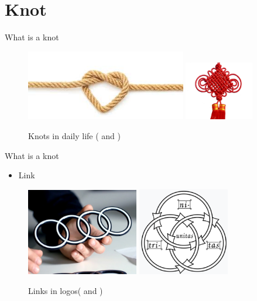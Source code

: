 \section{Knot}
\begin{frame}{What is a knot}
	\begin{figure}
		\centering
		\includegraphics[width=7cm]{Pictures/images.jpg}
		\includegraphics[width=3cm]{Pictures/chineseknot.png}
		\caption{Knots in daily life (\cite{Knotsdailylife} and \cite{Chineseknot})}
		\label{fig:enter-label}
	\end{figure}
\end{frame}

\begin{frame}{What is a knot}
	\begin{itemize}
		\item Link
	\end{itemize}
	\begin{figure}
		\centering
		\includegraphics[width = 4.9cm]{Pictures/audi.jpg}
		\includegraphics[width = 4cm]{Pictures/borromean.png}
		\caption{Links in logos(\cite{audi} and \cite{christiantrequetra})}
		\label{fig:enter-label}
	\end{figure}
	
	
\end{frame}

